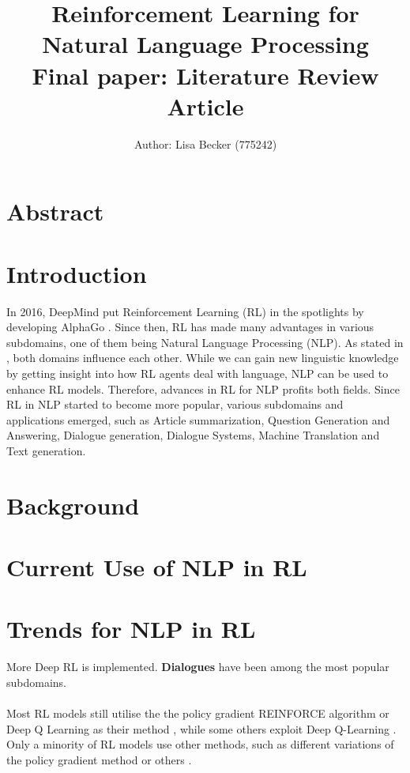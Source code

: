 \documentclass[11pt,a4paper]{article}
\title{{\LARGE Reinforcement Learning for Natural Language Processing}\\[1.5mm]
{\large Final paper: Literature Review Article}\\[1.5mm]}
\author{Author: Lisa Becker (775242) }
\begin{document}
\maketitle
\section{Abstract}


\section{Introduction}
In 2016, DeepMind put Reinforcement Learning (RL) in the spotlights by developing AlphaGo \citep{alphago}. Since then, RL has made many advantages in various subdomains, one of them being Natural Language Processing (NLP). As stated in \citet{ijcai2019}, both domains influence each other. While we can gain new linguistic knowledge by getting insight into how RL agents deal with language, NLP can be used to enhance RL models. Therefore, advances in RL for NLP profits both fields. Since RL in NLP started to become more popular, various subdomains and applications emerged, such as Article summarization, Question Generation and Answering, Dialogue generation, Dialogue Systems, Machine Translation and Text generation. 

\section{Background}

\section{Current Use of NLP in RL}


\section{Trends for NLP in RL}
More Deep RL is implemented. 
\textbf{Dialogues} have been among the most popular subdomains.\\\\ 
Most RL models still utilise the the policy gradient REINFORCE algorithm or Deep Q Learning as their method \citep{yasui-etal-2019, zhang-2018, hu-etal-2018-playing, godin-etal-2019-learning, huang-etal-2018-neural, mao-etal-2018-end, ranzato2015sequence, wu-etal-2018-study, clark-manning-2016-deep,yogatama-2017, guu-etal-2017-language, zeng-2018}, while some others exploit Deep Q-Learning \citet{narasimhan-etal-2016-improving, mosallanezhad-etal-2019-deep, ling-etal-2017-learning}. Only a minority of RL models use other methods, such as different variations of the policy gradient method \citet{branavan-2009, li-etal-2018-paraphrase, li-etal-2016-deep, le-fokkens-2017-tackling} or others \citet{dethlefs-cuayahuitl-2011,grissom-ii-etal-2014-dont, he-etal-2016-deep-reinforcement, chen-bansal-2018-fast, goyal-2019}.
\end{document}
